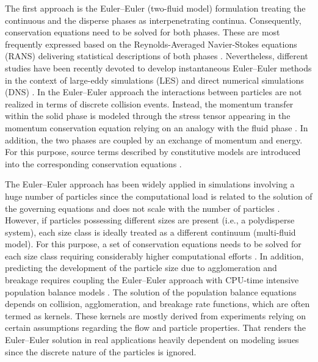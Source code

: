 The first approach is the Euler--Euler (two-fluid model) formulation
treating the continuous and the disperse phases as interpenetrating
continua.  Consequently, conservation equations need to be solved for
both phases. These are most frequently expressed based on the
Reynolds-Averaged Navier-Stokes equations (RANS) delivering
statistical descriptions of both phases
\citep[e.g.,][]{elghobashi1983two,zhou2010advances}. Nevertheless,
different studies have been recently devoted to develop instantaneous
Euler--Euler methods in the context of large-eddy simulations (LES)
\citep[e.g.,][]{moreau2010development,ma2015euler} and direct
numerical simulations (DNS) \citep[e.g.,][]{masi2014development}. In
the Euler--Euler approach the interactions between particles are not
realized in terms of discrete collision events. Instead, the momentum
transfer within the solid phase is modeled through the stress tensor
appearing in the momentum conservation equation relying on an analogy
with the fluid phase \citep{van2001comparative}.  In addition, the two
phases are coupled by an exchange of momentum and energy. For this
purpose, source terms described by constitutive models are introduced
into the corresponding conservation equations
\citep{balachandar2009scaling}.

The Euler--Euler approach has been widely applied in simulations
involving a huge number of particles since the computational load is
related to the solution of the governing equations and does not scale
with the number of particles \citep{sommerfeld2008}. However, if
particles possessing different sizes are present (i.e., a polydisperse
system), each size class is ideally treated as a different continuum
(multi-fluid model). For this purpose, a set of conservation equations
needs to be solved for each size class requiring considerably higher
computational efforts \citep{kuerten2016}.  In addition, predicting
the development of the particle size due to agglomeration and breakage
requires coupling the Euler--Euler approach with CPU-time intensive
population balance models
\citep{ramkrishna2000population,marchisio2003quadrature}. The solution
of the population balance equations depends on collision,
agglomeration, and breakage rate functions, which are often termed as
kernels. These kernels are mostly derived from experiments relying on
certain assumptions regarding the flow and particle properties.  That
renders the Euler--Euler solution in real applications heavily
dependent on modeling issues since the discrete nature of the
particles is ignored. \newline

